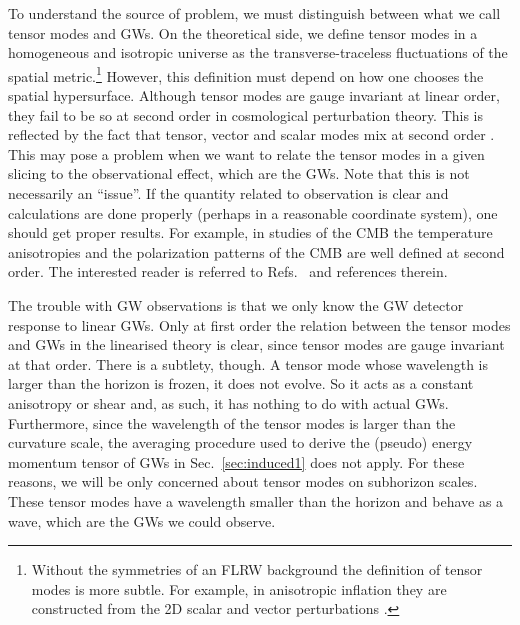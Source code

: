 \documentclass[a4paper,11pt]{article}
\numberwithin{equation}{section}
\begin{document}
To understand the source of problem, we must distinguish between what we call tensor modes and GWs. On the theoretical side, we define tensor modes in a homogeneous and isotropic universe as the transverse-traceless fluctuations of the spatial metric.\footnote{Without the symmetries of an FLRW background the definition of tensor modes is more subtle. For example, in anisotropic inflation they are constructed from the 2D scalar and vector perturbations \cite{Watanabe:2010fh,Soda:2012zm}.} However, this definition must depend on how one chooses the spatial hypersurface. Although tensor modes are gauge invariant at linear order, they fail to be so at second order in cosmological perturbation theory. This is reflected by the fact that tensor, vector and scalar modes mix at second order \cite{Matarrese:1997ay}. This may pose a problem when we want to relate the tensor modes in a given slicing to the observational effect, which are the GWs. Note that this is not necessarily an ``issue''. If the quantity related to observation is clear and calculations are done properly (perhaps in a reasonable coordinate system), one should get proper results. For example, in studies of the CMB the temperature anisotropies and the polarization patterns of the CMB are well defined at second order. The interested reader is referred to Refs.~\cite{Naruko:2013aaa,Saito:2014bxa,Namikawa:2021obu} and references therein. 

The trouble with GW observations is that we only know the GW detector response to linear GWs. Only at first order the relation between the tensor modes and GWs in the linearised theory is clear, since tensor modes are gauge invariant at that order. There is a subtlety, though. A tensor mode whose wavelength is larger than the horizon is frozen, it does not evolve. So it acts as a constant anisotropy or shear and, as such, it has nothing to do with actual GWs. Furthermore, since the wavelength of the tensor modes is larger than the curvature scale, the averaging procedure used to derive the (pseudo) energy momentum tensor of GWs in Sec.~\ref{sec:induced1} does not apply. For these reasons, we will be only concerned about tensor modes on subhorizon scales. These tensor modes have a wavelength smaller than the horizon and behave as a wave, which are the GWs we could observe.
\end{document}
